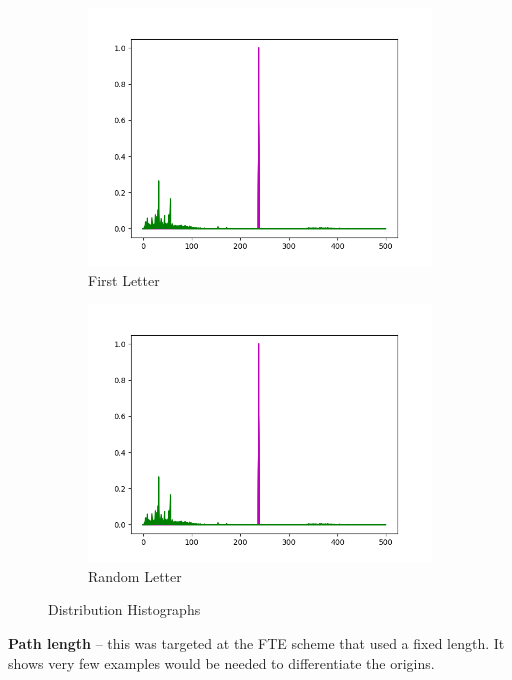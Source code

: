\documentclass[ %
                    author={Samuel Russell},
                supervisor={Prof. Bogdan Warinschi},
                    degree={MEng},
                     title={Innocuous Ciphertexts},
                  subtitle={The DE-CENSOR Scheme},
                      type={research},
                      year={2018} ]{dissertation}
\begin{document}
\begin{figure}[h]
\begin{subfigure}[b]{0.24\textwidth}
		\includegraphics[width=\textwidth]{bob}
		\caption{First Letter}
		\label{fig:first_hist}
	\end{subfigure}
	\begin{subfigure}[b]{0.24\textwidth}
		\includegraphics[width=\textwidth]{bob}
		\caption{Random Letter}
		\label{fig:rand_hist}
	\end{subfigure}

	\caption{Distribution Histographs}\label{fig:hists}
\end{figure}

\textbf{Path length} -- this was targeted at the FTE scheme that used a fixed length. It shows very few examples would be needed to differentiate the origins.
\end{document}

